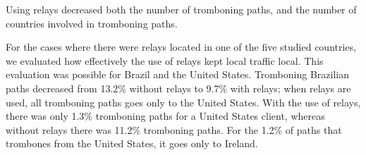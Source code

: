 \begin{finding}
Using relays decreased both the number of tromboning paths, and the
number of countries involved in tromboning paths.
\end{finding}
\noindent
For the cases where there were relays located in one of the five studied countries, we evaluated how effectively the use of relays kept local traffic local.  This evaluation was possible for Brazil and the United States.  Tromboning Brazilian paths decreased from 13.2\% without relays to 9.7\% with relays; when relays are used, all tromboning paths goes only to the United States.  With the use of relays, there was only 1.3\% tromboning paths for a United States client, whereas without relays there was 11.2\% tromboning paths.  For the 1.2\% of paths that trombones from the United States, it goes only to Ireland.

